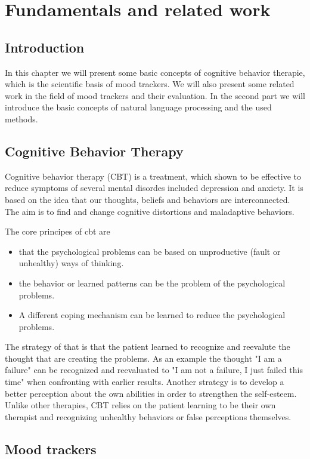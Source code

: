 \chapter{Fundamentals and related work}
\label{ch:basics}

\section{Introduction}

In this chapter we will present some basic concepts of cognitive behavior therapie, 
which is the scientific basis of mood trackers.
We will also present some related work in the field of mood trackers and their evaluation.
In the second part we will introduce the basic concepts of natural language processing and the used methods.

\section{Cognitive Behavior Therapy}

Cognitive behavior therapy (CBT) is a treatment, which shown to be effective to reduce symptoms of several mental disordes 
included depression and anxiety.
It is based on the idea that our thoughts, beliefs and behaviors are interconnected.
The aim is to find and change cognitive distortions and maladaptive behaviors.

The core principes of cbt are
\begin{itemize}
    \item that the psychological problems can be based on unproductive (fault or unhealthy) ways of thinking.
    \item the behavior or learned patterns can be the problem of the psychological problems.
    \item A different coping mechanism can be learned to reduce the psychological problems.
\end{itemize}

The strategy of that is that the patient learned to recognize and reevalute the thought that are creating the problems.
As an example the thought "I am a failure" can be recognized and reevaluated to "I am not a failure, I just failed this time" 
when confronting with earlier results.
Another strategy is to develop a better perception about the own abilities in order to strengthen the self-esteem.
Unlike other therapies, CBT relies on the patient learning to be their own therapist 
and recognizing unhealthy behaviors or false perceptions themselves. 

\section{Mood trackers}



